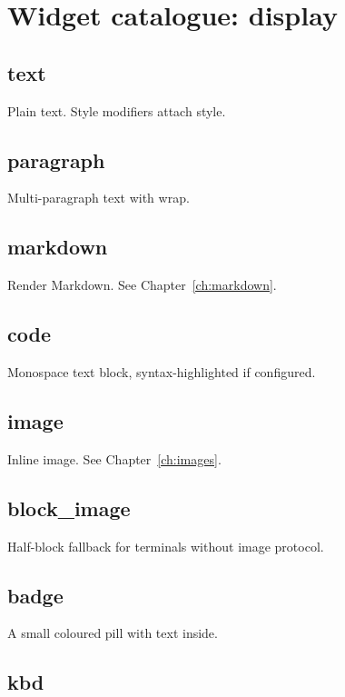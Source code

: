 \chapter{Widget catalogue: display}
\label{ch:catalogue_display}

\section{text}

Plain text. Style modifiers attach style.

\section{paragraph}

Multi-paragraph text with wrap.

\section{markdown}

Render Markdown. See Chapter~\ref{ch:markdown}.

\section{code}

Monospace text block, syntax-highlighted if configured.

\section{image}

Inline image. See Chapter~\ref{ch:images}.

\section{block\_image}

Half-block fallback for terminals without image
protocol.

\section{badge}

A small coloured pill with text inside.

\section{kbd}

